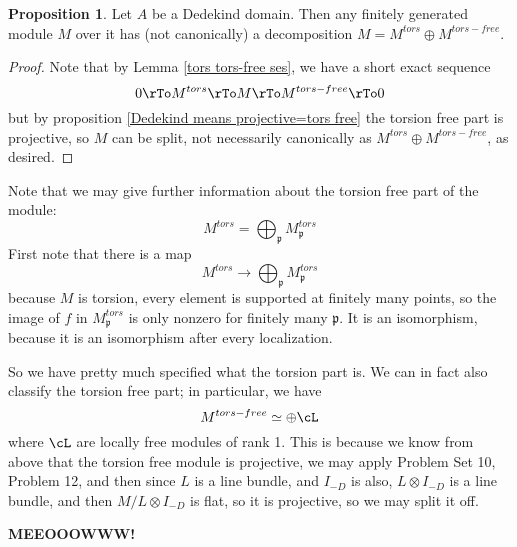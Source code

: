 \documentclass[12 pt]{article}
\theoremstyle{definition}
\newtheorem{propn}[thm]{Proposition}
\renewcommand{\(}{\left(}
\renewcommand{\)}{\right)}
\newcommand\fp{{\mathfrak p}}
\begin{document}
\begin{propn}
Let $A$ be a Dedekind domain. Then any finitely generated module $M$ over it has (not canonically) a decomposition $M=M^{tors} \oplus M^{tors-free}$.
\end{propn}
\begin{proof}
Note that by Lemma \ref{tors tors-free ses}, we have a short exact sequence
\[ 0 \rTo M^{tors} \rTo M \rTo M^{tors-free} \rTo 0\]
but by proposition \ref{Dedekind means projective=tors free} the torsion free part is projective, so $M$ can be split, not necessarily canonically as  $M^{tors} \oplus M^{tors-free}$, as desired.
\end{proof}

Note that we may give further information about the torsion free part of the module:
\[M^{tors}=\bigoplus_{\fp} M_{\fp}^{tors}\]
First note that there is a map
\[M^{tors} \to \bigoplus_{\fp} M_{\fp}^{tors}\]
because $M$ is torsion, every element is supported at finitely many points, so the image of $f$ in $M^{tors}_\fp$ is only nonzero for finitely many $\fp$.
It is an isomorphism, because it is an isomorphism after every localization.

So we have pretty much specified what the torsion part is. We can in fact also classify the torsion free part;  in particular, we have
\[M^{tors-free} \simeq \oplus \cL\]
where $\cL$ are locally free modules of rank 1.
This is because we know from above that the torsion free module is projective, we may apply Problem Set 10, Problem 12, and then since $L$ is a line bundle, and $I_{-D}$ is also, $L \otimes I_{-D}$ is a line bundle, and then $M/L \otimes I_{-D}$ is flat, so it is projective, so we may split it off.


\textcolor[rgb]{1.00,0.00,0.00}{\textbf{MEEOOOWWW!}}
\end{document}
